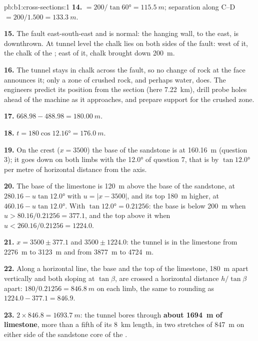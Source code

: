 \begin{solution}{pb:b1:cross-sections:1}
\textbf{14.}  $= 200/\tan\ang{60} = \qty{115.5}{m}$; separation along
C--D $= 200/1.500 = \qty{133.3}{m}$.

\textbf{15.} The fault  east-south-east and is normal: the hanging wall,
to the east, is downthrown. At tunnel level the chalk lies on both sides of
the fault: west of it, the chalk of the ; east of it, chalk brought
down \qty{200}{m}.

\textbf{16.} The tunnel stays in chalk across the fault, so no change of rock
at the face announces it; only a zone of crushed rock, and perhaps water,
does. The engineers predict its position from the section (here
\qty{7.22}{km}), drill probe holes ahead of the machine as it approaches, and
prepare support for the crushed zone.

\textbf{17.} $668.98 - 488.98 = \qty{180.00}{m}$.

\textbf{18.} $t = 180\cos\ang{12.16} = \qty{176.0}{m}$.

\textbf{19.} On the crest ($x = 3500$) the base of the sandstone is at
\qty{160.16}{m} (question 3); it goes down on both limbs with the  \ang{12.0} of question 7, that is by $\tan\ang{12.0}$ per metre of
horizontal distance from the axis.

\textbf{20.} The base of the limestone is \qty{120}{m} above the base of the
sandstone, at $280.16 - u\tan\ang{12.0}$ with $u = |x - 3500|$, and its top
\qty{180}{m} higher, at $460.16 - u\tan\ang{12.0}$. With $\tan\ang{12.0} =
0.21256$: the base is below \qty{200}{m} when $u > 80.16/0.21256 = 377.1$,
and the top above it when $u < 260.16/0.21256 = 1224.0$.

\textbf{21.} $x = 3500 \pm 377.1$ and $3500 \pm 1224.0$: the tunnel is in
the limestone from \qty{2276}{m} to \qty{3123}{m} and from \qty{3877}{m} to
\qty{4724}{m}.

\textbf{22.} Along a horizontal line, the base and the top of the limestone,
\qty{180}{m} apart vertically and both sloping at $\tan\beta$, are crossed a
horizontal distance $h/\tan\beta$ apart: $180/0.21256 = \qty{846.8}{m}$ on
each limb, the same to rounding as $1224.0 - 377.1 = 846.9$.

\textbf{23.} $2\times846.8 = \qty{1693.7}{m}$: the tunnel bores through
\textbf{about \qty[text-series-to-math=true]{1694}{m} of limestone}, more than a fifth of its
\qty{8}{km} length, in two stretches of \qty{847}{m} on either side of the
sandstone core of the .
\end{solution}
